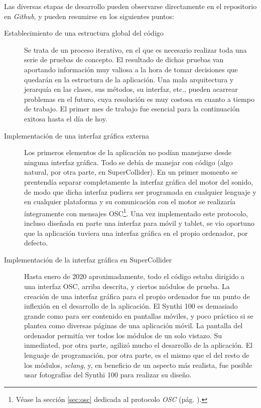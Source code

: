 Las diversas etapas de desarrollo pueden observarse directamente en el repositorio en \textit{Github}, y pueden resumirse en los siguientes puntos:

\begin{description} 
	\item[Establecimiento de una estructura global del código] Se trata de un proceso iterativo, en el que es necesario realizar toda una serie de pruebas de concepto. El resultado de dichas pruebas van aportando información muy valiosa a la hora de tomar decisiones que quedarán en la estructura de la aplicación. Una mala arquitectura y jerarquía en las clases, sus métodos, su interfaz, etc., pueden acarrear problemas en el futuro, cuya resolución es muy costosa en cuanto a tiempo de trabajo. El primer mes de trabajo fue esencial para la continuación exitosa hasta el día de hoy.
	
	\item[Implementación de una interfaz gráfica externa] Los primeros elementos de la aplicación no podían manejarse desde ninguna interfaz gráfica. Todo se debía de manejar con código (algo natural, por otra parte, en SuperCollider). En un primer momento se prentendía separar completamente la interfaz gráfica del motor del sonido, de modo que dicha interfaz pudiera ser programada en cualquier lenguaje y en cualquier plataforma y su comunicación con el motor se realizaría íntegramente con mensajes OSC\footnote{Véase la sección \ref{sec:osc} dedicada al protocolo \textit{OSC} (pág. \pageref{sec:osc}).}. Una vez implementado este protocolo, incluso diseñada en parte una interfaz para móvil y tablet, se vio oportuno que la aplicación tuviera una interfaz gráfica en el propio ordenador, por defecto.
	
	\item[Implementación de la interfaz gráfica en SuperCollider] Hasta enero de 2020 aproximadamente, todo el código estaba dirigido a una interfaz OSC, arriba descrita, y ciertos módulos de prueba. La creación de una interfaz gráfica para el propio ordenador fue un punto de inflexión en el desarrollo de la aplicación. El Synthi 100 es demasiado grande como para ser contenido en pantallas móviles, y poco práctico si se plantea como diversas páginas de una aplicación móvil. La pantalla del ordenador permitía ver todos los módulos de un solo vistazo. Su inmediated, por otra parte, agilizó mucho el desarrollo de la aplicación. El lenguaje de programación, por otra parte, es el mismo que el del resto de los módulos, \textit{sclang}, y, en beneficio de un aspecto más realista, fue posible usar fotografías del Synthi 100 para realizar su diseño.
	

\end{description}
